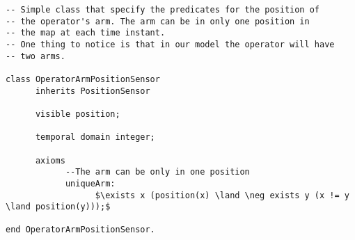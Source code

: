 \begin{lstlisting}[fontadjust, mathescape, frame=single] 
-- Simple class that specify the predicates for the position of
-- the operator's arm. The arm can be in only one position in 
-- the map at each time instant. 
-- One thing to notice is that in our model the operator will have
-- two arms.

class OperatorArmPositionSensor
      inherits PositionSensor

      visible position;

      temporal domain integer;

      axioms
            --The arm can be only in one position
            uniqueArm: 
                  $\exists x (position(x) \land \neg exists y (x != y \land position(y)));$

end OperatorArmPositionSensor.
\end{lstlisting}
